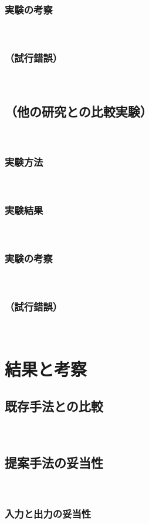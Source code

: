 \documentclass[12pt,a4j]{jreport}
\begin{document}
\subsection{実験の考察}
~

\subsection{（試行錯誤）}
~

\section{（他の研究との比較実験）}
~

\subsection{実験方法}
~

\subsection{実験結果}
~

\subsection{実験の考察}
~

\subsection{（試行錯誤）}
~


\chapter{結果と考察}


\section{既存手法との比較}
~

\section{提案手法の妥当性}
~

\subsection{入力と出力の妥当性}
~
\end{document}
